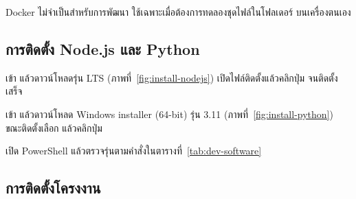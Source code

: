 Docker ไม่จำเป็นสำหรับการพัฒนา ใช้เฉพาะเมื่อต้องการทดลองชุดไฟล์ในโฟลเดอร์  บนเครื่องตนเอง

\subsection{การติดตั้ง Node.js และ Python}

\begin{steps}
  \item เข้า  แล้วดาวน์โหลดรุ่น LTS (ภาพที่~\ref{fig:install-nodejs}) เปิดไฟล์ติดตั้งแล้วคลิกปุ่ม  จนติดตั้งเสร็จ
  \item เข้า  แล้วดาวน์โหลด Windows installer (64-bit) รุ่น 3.11 (ภาพที่~\ref{fig:install-python}) ขณะติดตั้งเลือก  แล้วคลิกปุ่ม 
  \item เปิด PowerShell แล้วตรวจรุ่นตามคำสั่งในตารางที่~\ref{tab:dev-software}
\end{steps}



\subsection{การติดตั้งโครงงาน}

